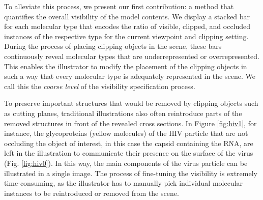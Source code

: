 To alleviate this process, we present our first contribution: a method that quantifies the overall visibility of the model contents. We display a stacked bar for each molecular type that encodes the ratio of visible, clipped, and occluded instances of the respective type for the current viewpoint and clipping setting. 
During the process of placing clipping objects in the scene, these bars continuously reveal molecular types that are underrepresented or overrepresented. 
This enables the illustrator to modify the placement of the clipping objects in such a way that every molecular type is adequately represented in the scene. We call this the \emph{coarse level} of the visibility specification process.

To preserve important structures that would be removed by clipping objects such as cutting planes, traditional illustrations also often reintroduce parts of the removed structures in front of the revealed cross sections. 
In Figure \ref{fig:hiv1}, for instance, the glycoproteins (yellow molecules) of the HIV particle that are not occluding the object of interest, in this case the capsid containing the RNA, are left in the illustration to communicate their presence on the surface of the virus (Fig. \ref{fig:hiv0}).
In this way, the main components of the virus particle can be illustrated in a single image.
The process of fine-tuning the visibility is extremely time-consuming, as the illustrator has to manually pick individual molecular instances to be reintroduced or removed from the scene. %

